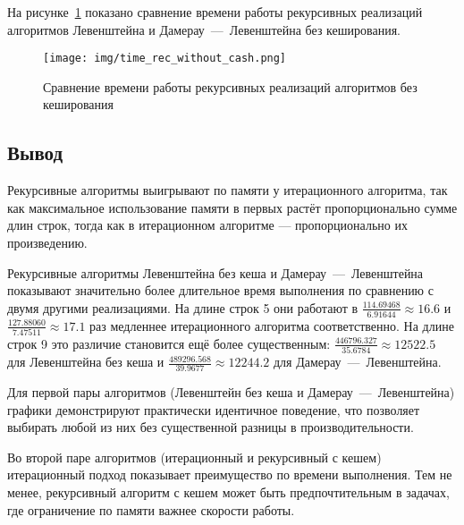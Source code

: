 \noindent
\hspace{0.75cm}
На рисунке~\ref{img:time_rec_without_cash} показано сравнение времени работы рекурсивных реализаций алгоритмов Левенштейна и Дамерау~---~Левенштейна без кеширования.

\begin{figure}[H]
    \centering
    \texttt{[image: img/time\_rec\_without\_cash.png]}
    \caption{Сравнение времени работы рекурсивных реализаций алгоритмов без кеширования}
    \label{img:time_rec_without_cash}
\end{figure}

\subsection*{Вывод}

\noindent  
\hspace{0.75cm} 
Рекурсивные алгоритмы выигрывают по памяти у итерационного алгоритма, так как максимальное использование памяти в первых растёт пропорционально сумме длин строк, тогда как в итерационном алгоритме — пропорционально их произведению. 

\noindent  
\hspace{0.75cm}  
Рекурсивные алгоритмы Левенштейна без кеша и Дамерау~---~Левенштейна показывают значительно более длительное время выполнения по сравнению с двумя другими реализациями. На длине строк 5 они работают в \( \frac{114.69468}{6.91644} \approx 16.6 \) и \( \frac{127.88060}{7.47511} \approx 17.1 \) раз медленнее итерационного алгоритма соответственно. На длине строк 9 это различие становится ещё более существенным: \( \frac{446796.327}{35.6784} \approx 12522.5 \) для Левенштейна без кеша и \( \frac{489296.568}{39.9677} \approx 12244.2 \) для Дамерау~---~Левенштейна.  

\noindent  
\hspace{0.75cm} 
Для первой пары алгоритмов (Левенштейн без кеша и Дамерау~---~Левенштейна) графики демонстрируют практически идентичное поведение, что позволяет выбирать любой из них без существенной разницы в производительности.

\noindent  
\hspace{0.75cm} 
Во второй паре алгоритмов (итерационный и рекурсивный с кешем) итерационный подход показывает преимущество по времени выполнения. Тем не менее, рекурсивный алгоритм с кешем может быть предпочтительным в задачах, где ограничение по памяти важнее скорости работы. 

